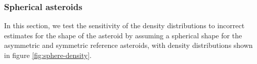 \documentclass[fleqn,usenatbib]{mnras}
\begin{document}




\subsubsection{Spherical asteroids}
\label{sec:spherical-density}
In this section, we test the sensitivity of the density distributions to incorrect estimates for the shape of the asteroid by assuming a spherical shape for the asymmetric and symmetric reference asteroids, with density distributions shown in figure \ref{fig:sphere-density}.
\end{document}
